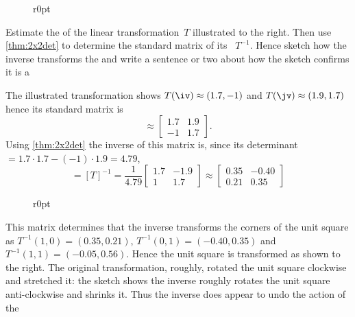 \begin{wrapfigure}r{0pt} 
\end{wrapfigure}
\begin{example} 
Estimate the  of the linear transformation~\(T\) illustrated to the right.  
Then use \cref{thm:2x2det} to determine the standard matrix of its 
~\(T^{-1}\).
Hence sketch how the inverse transforms the  and write a sentence or two about how the sketch confirms it is a 
\begin{solution} 
The illustrated transformation shows \(T(\iv)\approx(1.7,-1)\) and \(T(\jv)\approx(1.9,1.7)\) hence its standard matrix is
\begin{equation*}
[T]\approx\begin{bmatrix} 1.7&1.9\\-1&1.7 \end{bmatrix}.
\end{equation*}
Using \cref{thm:2x2det} the inverse of this matrix is, since its determinant\({}=1.7\cdot1.7-(-1)\cdot1.9=4.79\),
\begin{equation*}
[T^{-1}]=[T]^{-1}
=\frac1{4.79} \begin{bmatrix} 1.7&-1.9\\1&1.7 \end{bmatrix}
\approx\begin{bmatrix} 0.35&-0.40\\0.21&0.35 \end{bmatrix}
\end{equation*}

\begin{wrapfigure}r{0pt}
\end{wrapfigure}
This matrix determines that the inverse transforms the corners of the unit square as \(T^{-1}(1,0)=(0.35,0.21)\), \(T^{-1}(0,1)=(-0.40,0.35)\) and \(T^{-1}(1,1)=(-0.05,0.56)\).
Hence the unit square is transformed as shown to the right.
The original transformation, roughly, rotated the unit square clockwise and stretched it: the sketch shows the inverse roughly rotates the unit square anti-clockwise and shrinks it.  
Thus the inverse does appear to undo the action of the 
\end{solution}
\end{example}



